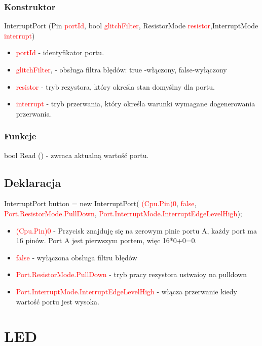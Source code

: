 \documentclass{article}
\begin{document}
\subsubsection{Konstruktor}
 InterruptPort (Pin \textcolor{red}{portId}, bool \textcolor{red}{glitchFilter}, ResistorMode \textcolor{red}{resistor},\newline InterruptMode \textcolor{red}{interrupt})
\begin{itemize}
\item \textcolor{red}{portId} - identyfikator portu.
\item \textcolor{red}{glitchFilter}, - obsługa filtra błędów: true -włączony, false-wyłączony
\item \textcolor{red}{resistor} - tryb rezystora, który określa stan domyślny dla portu.
\item \textcolor{red}{interrupt} - tryb przerwania, który określa warunki wymagane do\newline generowania przerwania.
\end{itemize}
\subsubsection{Funkcje}
bool Read () - zwraca aktualną wartość portu.

\subsection{Deklaracja}
InterruptPort button = 
new InterruptPort(\space \textcolor{red}{ (Cpu.Pin)0}, \space \textcolor{red}{ false},\space \textcolor{red}{ Port.ResistorMode.PullDown}, \space \textcolor{red}{ Port.InterruptMode.InterruptEdgeLevelHigh});
\begin{itemize}
\item \textcolor{red}{(Cpu.Pin)0} - Przycisk znajduję się na zerowym pinie portu A, każdy port ma 16 pinów. Port A jest pierwszym portem, więc 16*0+0=0.
\item \textcolor{red}{false} - wyłączona obsługa filtru błędów
\item \textcolor{red}{Port.ResistorMode.PullDown} - tryb pracy rezystora ustwaioy na pulldown
\item \textcolor{red}{Port.InterruptMode.InterruptEdgeLevelHigh} - włącza przerwanie kiedy wartość portu jest wysoka.
\end{itemize}

\section{LED}
\end{document}
